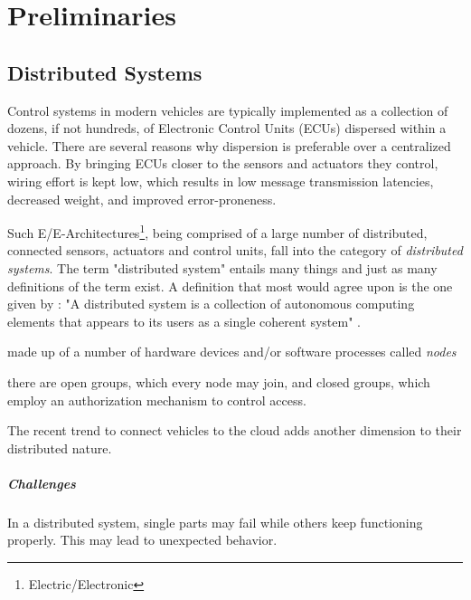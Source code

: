 

\chapter{Preliminaries}\label{chapter:preliminaries}


\section{Distributed Systems}

Control systems in modern vehicles are typically implemented as a collection of dozens, if not hundreds, of Electronic Control Units (ECUs) dispersed within a vehicle. There are several reasons why dispersion is preferable over a centralized approach. By bringing ECUs closer to the sensors and actuators they control, wiring effort is kept low, which results in low message transmission latencies, decreased weight, and improved error-proneness. 

Such E/E-Architectures\footnote{Electric/Electronic}, being comprised of a large number of distributed, connected sensors, actuators and control units, fall into the category of \emph{distributed systems}. The term "distributed system" entails many things and just as many definitions of the term exist. A definition that most would agree upon is the one given by \citeauthor*{tanenbaum2017distributed}: "A distributed system is a collection of autonomous computing elements that appears to its users as a single coherent system" \cite{tanenbaum2017distributed}.


made up of a number of hardware devices and/or software processes called \emph{nodes}

there are open groups, which every node may join, and closed groups, which employ an authorization mechanism to control access.

The recent trend to connect vehicles to the cloud adds another dimension to their distributed nature.


\paragraph{Challenges} In a distributed system, single parts may fail while others keep functioning properly.  This may lead to unexpected behavior.


